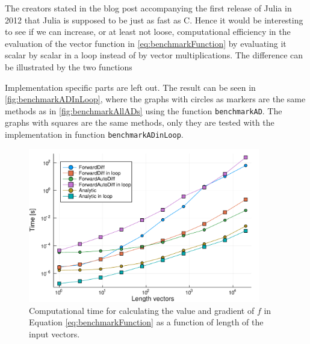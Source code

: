 The creators stated in the blog post accompanying the first release of Julia in 2012 \emph{\citep{juliaBlogRelease2012}} that Julia is supposed to be just as fast as C. Hence it would be interesting to see if we can increase, or at least not loose, computational efficiency in the evaluation of the vector function in \eqref{eq:benchmarkFunction} by evaluating it scalar by scalar in a loop instead of by vector multiplications. The difference can be illustrated by the two functions

Implementation specific parts are left out. The result can be seen in \autoref{fig:benchmarkADInLoop}, where the graphs with circles as markers are the same methods as in \autoref{fig:benchmarkAllADs} using the function \texttt{benchmarkAD}. The graphs with squares are the same methods, only they are tested with the implementation in function \texttt{benchmarkADinLoop}.
\begin{figure}[H]
    \centering
    \includegraphics[width = 0.9\textwidth]{figures/benchmark_ad_in_loop.pdf}
    \caption{Computational time for calculating the value and gradient of $f$ in Equation \eqref{eq:benchmarkFunction} as                         a function of length of the input vectors.}
    \label{fig:benchmarkADInLoop}
\end{figure}

